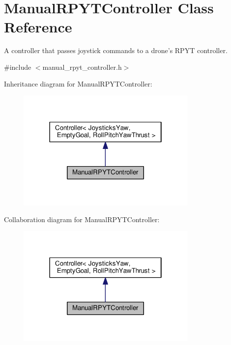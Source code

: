 \hypertarget{classManualRPYTController}{\section{Manual\-R\-P\-Y\-T\-Controller Class Reference}
\label{classManualRPYTController}
}


A controller that passes joystick commands to a drone's R\-P\-Y\-T controller.  




{\ttfamily \#include $<$manual\-\_\-rpyt\-\_\-controller.\-h$>$}



Inheritance diagram for Manual\-R\-P\-Y\-T\-Controller\-:\nopagebreak
\begin{figure}[H]
\begin{center}
\leavevmode
\includegraphics[width=250pt]{classManualRPYTController__inherit__graph}
\end{center}
\end{figure}


Collaboration diagram for Manual\-R\-P\-Y\-T\-Controller\-:\nopagebreak
\begin{figure}[H]
\begin{center}
\leavevmode
\includegraphics[width=250pt]{classManualRPYTController__coll__graph}
\end{center}
\end{figure}
